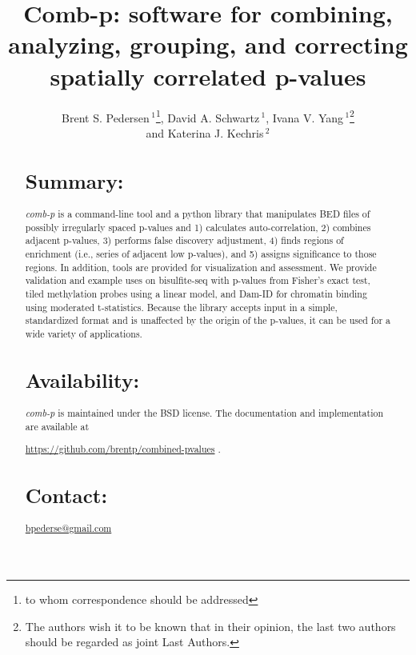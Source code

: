 \documentclass{bioinfo}
\begin{document}

\title[comb-p]{Comb-p: software for combining, analyzing, grouping, and correcting spatially correlated p-values}
\author[Pedersen \textit{et~al}]{Brent S. Pedersen\,$^1$\footnote{to whom correspondence should be addressed},
 David A. Schwartz\,$^1$,
    Ivana V. Yang\,$^1$\footnote{The authors wish it to be known that in their opinion,
the last two authors should be regarded as joint Last Authors.}

and Katerina J.  Kechris\,$^2$\footnotemark[2]{}

}

\address{$^{1}$Department of Medicine, University of Colorado, Denver, Anschutz Medical Campus, Aurora CO 80045,
USA\\
$^{2}$Department of Biostatistics and Informatics, University of Colorado, Denver, Anschutz Medical Campus, Aurora CO 80045, USA\\
}


\maketitle
\begin{abstract}

\section{Summary:}
\textit{comb-p} is a command-line tool and a python library that
manipulates BED files of possibly irregularly spaced p-values and
1) calculates auto-correlation,
2) combines adjacent p-values,
3) performs false discovery adjustment,
4) finds regions of enrichment (i.e., series of adjacent low p-values), and
5) assigns significance to those regions.
In addition, tools are provided for visualization and
assessment.
We provide validation and example uses on bisulfite-seq with p-values
from Fisher's exact test,
tiled methylation probes using a linear model, and Dam-ID for chromatin binding
using moderated t-statistics. Because the library
accepts input in a simple, standardized format and is unaffected by the origin
of the p-values, it can be used for a wide variety of applications.

\section{Availability:}
\textit{comb-p} is maintained under the BSD license. The documentation and
implementation are available at

\href{https://github.com/brentp/combined-pvalues}{https://github.com/brentp/combined-pvalues} .

\section{Contact:} \href{bpederse@gmail.com}{bpederse@gmail.com}

\end{abstract}
\end{document}
